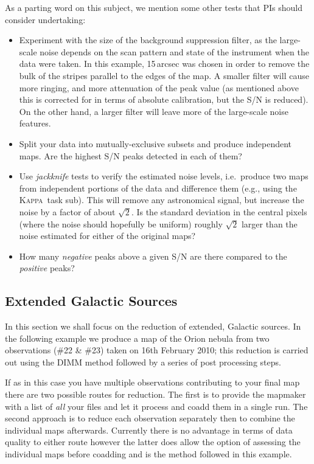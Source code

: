 \documentclass[twoside,11pt]{article}
\newcommand{\xref}[3]{#1}
\newcommand{\xlabel}[1]{}
\renewcommand{\_}{\texttt{\symbol{95}}}
\newcommand{\Kappa}{\xref{\textsc{Kappa}}{sun95}{}}
\newcommand{\task}[1]{\textsf{#1}}
\newcommand{\sub}{\xref{\task{sub}}{sun95}{SUB}}
\begin{document}
As a parting word on this subject, we mention some other tests that
PIs should consider undertaking:

\begin{itemize}

\item Experiment with the size of the background suppression filter,
  as the large-scale noise depends on the scan pattern and state of
  the instrument when the data were taken. In this example, 15\,arcsec
  was chosen in order to remove the bulk of the stripes parallel to
  the edges of the map. A smaller filter will cause more ringing, and
  more attenuation of the peak value (as mentioned above this is
  corrected for in terms of absolute calibration, but the S/N is
  reduced). On the other hand, a larger filter will leave more of the
  large-scale noise features.

\item Split your data into mutually-exclusive subsets and produce
  independent maps. Are the highest S/N peaks detected in each of
  them?

\item Use {\em jackknife} tests to verify the estimated noise levels,
  i.e.~produce two maps from independent portions of the data and
  difference them (e.g., using the \Kappa\ task \sub). This will
  remove any astronomical signal, but increase the noise by a factor
  of about $\sqrt{2}$. Is the standard deviation in the central pixels
  (where the noise should hopefully be uniform) roughly $\sqrt{2}$
  larger than the noise estimated for either of the original maps?

\item How many {\em negative} peaks above a given S/N are there
  compared to the {\em positive} peaks?

\end{itemize}

\subsection{\xlabel{Galactic}Extended Galactic Sources}
\label{sec:galactic}
In this section we shall focus on the reduction of extended, Galactic
sources. In the following example we produce a map of the Orion nebula
from two observations (\#22 \& \#23) taken on 16th February 2010; this
reduction is carried out using the DIMM method followed by a series of
post processing steps.

If as in this case you have multiple observations contributing to your
final map there are two possible routes for reduction. The first is to
provide the mapmaker with a list of \textit{all} your files and let it
process and coadd them in a single run.  The second approach is to
reduce each observation separately then to combine the individual maps
afterwards. Currently there is no advantage in terms of data quality
to either route however the latter does allow the option of assessing
the individual maps before coadding and is the method followed in this
example.
\end{document}
